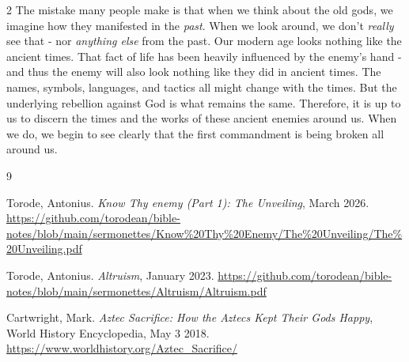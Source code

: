 \documentclass[10pt]{article}
\begin{document}
\begin{multicols}{2}
The mistake many people make is that when we think about the old gods, we imagine how they manifested in the \textit{past}. When we look around, we don't \textit{really} see that - nor \textit{anything else} from the past. Our modern age looks nothing like the ancient times. That fact of life has been heavily influenced by the enemy's hand - and thus the enemy will also look nothing like they did in ancient times. The names, symbols, languages, and tactics all might change with the times. But the underlying rebellion against God is what remains the same. Therefore, it is up to us to discern the times and the works of these ancient enemies around us. When we do, we begin to see clearly that the first commandment is being broken all around us.


\begin{thebibliography}{9}
	{\footnotesize
		
	 Torode, Antonius. \textit{Know Thy enemy (Part 1): The Unveiling}, March 2026. \url{https://github.com/torodean/bible-notes/blob/main/sermonettes/Know%20Thy%20Enemy/The%20Unveiling/The%20Unveiling.pdf}
	
	 Torode, Antonius. \textit{Altruism}, January 2023. \url{https://github.com/torodean/bible-notes/blob/main/sermonettes/Altruism/Altruism.pdf}
	
	 Cartwright, Mark. \textit{Aztec Sacrifice: How the Aztecs Kept Their Gods Happy}, World History Encyclopedia, May 3 2018.
	 \url{https://www.worldhistory.org/Aztec_Sacrifice/}
	}
\end{thebibliography}

\end{multicols}


\end{document}
